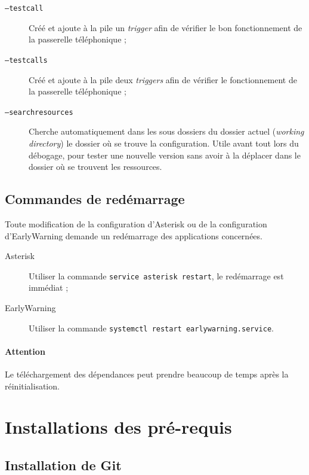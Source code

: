 \documentclass{article}
\begin{document}
\begin{description}
    \item[\texttt{--testcall}] Créé et ajoute à la pile un \emph{trigger} afin de vérifier le bon fonctionnement de la passerelle téléphonique ;
    \item[\texttt{--testcalls}] Créé et ajoute à la pile deux \emph{triggers} afin de vérifier le fonctionnement de la passerelle téléphonique ;
    \item[\texttt{--searchresources}] Cherche automatiquement dans les sous dossiers du dossier actuel (\emph{working directory}) le dossier où se trouve la configuration. Utile avant tout lors du débogage, pour tester une nouvelle version sans avoir à la déplacer dans le dossier où se trouvent les ressources.
\end{description}

\subsection{Commandes de redémarrage}

Toute modification de la configuration d'Asterisk ou de la configuration d'EarlyWarning demande un redémarrage des applications concernées. 

\begin{description}
    \item[Asterisk] Utiliser la commande \texttt{service asterisk restart}, le redémarrage est immédiat ;
    \item[EarlyWarning] Utiliser la commande \texttt{systemctl restart earlywarning.service}.
\end{description}

\paragraph{Attention} Le téléchargement des dépendances peut prendre beaucoup de temps après la réinitialisation.

\pagebreak
\section{Installations des pré-requis}

\subsection{Installation de Git}
\end{document}
